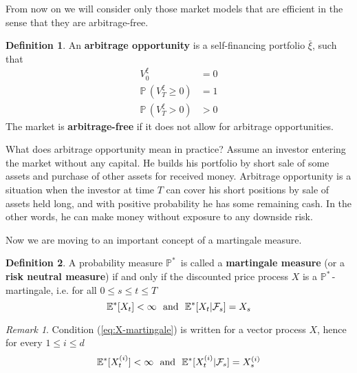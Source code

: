 \documentclass[a4paper,11pt, twoside]{book}
\theoremstyle{definition}
\newtheorem{mydef}{Definition}[chapter]
\theoremstyle{remark}
\newtheorem{remark}{Remark}[chapter]
\def\P{{\mathbb{P}}\,}
\def\Em{{\mathbb{E}^*}}
\def\Pm{{\mathbb{P}}^*\,}
\def\xia{\bar{\xi}}
\begin{document}
From now on we will consider only those market models that are efficient in the sense that they are arbitrage-free.
\begin{mydef}
 An \textbf{arbitrage opportunity} is a self-financing portfolio $\xia$, such that
 \begin{align*}
  V^{\xi}_0 &= 0\\
  \P(V^{\xi}_T \geq 0) &= 1\\
  \P(V^{\xi}_T > 0 ) &> 0
 \end{align*}
 The market is \textbf{arbitrage-free} if it does not allow for arbitrage opportunities.
\end{mydef}
What does arbitrage opportunity mean in practice? Assume an investor entering the market without any capital. He builds his portfolio by short sale of some assets and purchase of other assets for received money. Arbitrage opportunity is a situation when the investor at time $T$ can cover his short positions by sale of assets held long, and with positive probability he has some remaining cash.
In the other words, he can make money without exposure to any downside risk. 

Now we are moving to an important concept of a martingale measure.
\begin{mydef}
 A probability measure $\Pm$ is called a \textbf{martingale measure} (or a \textbf{risk neutral measure}) if and only if the discounted price process $X$ is a $\Pm$-martingale, i.e. for all  $0 \leq s \leq t \leq T$
 \begin{equation}
  \label{eq:X-martingale}
  \Em[X_t] < \infty \hbox{\ \ and\ \ } \Em[X_t | \mathcal{F}_s] = X_s
 \end{equation}
\end{mydef}

\begin{remark}
 Condition (\ref{eq:X-martingale}) is written for a vector process $X$, hence for every $1 \leq i \leq d$
  \begin{equation*}
  \Em[X^{(i)}_t] < \infty \hbox{\ \ and\ \ } \Em[X^{(i)}_t | \mathcal{F}_s] = X^{(i)}_s
 \end{equation*}
\end{remark}
\end{document}
